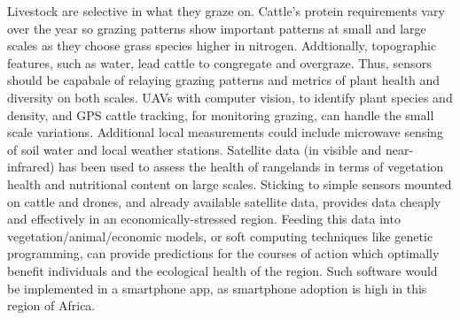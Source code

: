 Livestock are selective in what they graze on. Cattle's protein requirements vary over the year so grazing patterns show important patterns at small and large scales as they choose grass species higher in nitrogen. Addtionally, topographic features, such as water, lead cattle to congregate and overgraze. Thus, sensors should be capabale of relaying grazing patterns and metrics of plant health and diversity on both scales. UAVs with computer vision, to identify plant species and density, and GPS cattle tracking, for monitoring grazing, can handle the small scale variations. Additional local measurements could include microwave sensing of soil water and local weather stations. Satellite data (in visible and near-infrared) has been used to assess the health of rangelands in terms of vegetation health and nutritional content on large scales. Sticking to simple sensors mounted on cattle and drones, and already available satellite data, provides data cheaply and effectively in an economically-stressed region. Feeding this data into vegetation/animal/economic models, or soft computing techniques like genetic programming, can provide predictions for the courses of action which optimally benefit individuals and the ecological health of the region. Such software would be implemented in a smartphone app, as smartphone adoption is high in this region of Africa.

